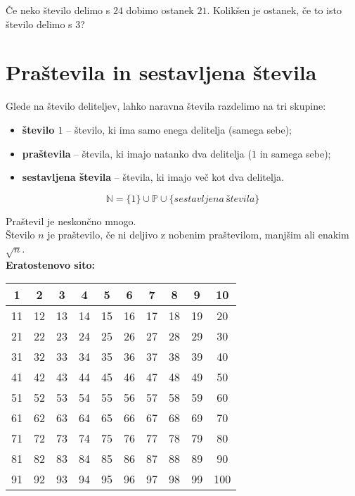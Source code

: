             \begin{naloga}
                Če neko število delimo s $24$ dobimo ostanek $21$. Kolikšen je ostanek, če to isto število delimo s $3$? 
            \end{naloga}



            \newpage
\section{Praštevila in sestavljena števila}
                
            Glede na število deliteljev, lahko naravna števila razdelimo na tri skupine:
            \begin{itemize}
                \item \textbf{število $1$} -- število, ki ima samo enega delitelja (samega sebe);
                \item \textbf{praštevila} -- števila, ki imajo natanko dva delitelja ($1$ in samega sebe);
                \item \textbf{sestavljena števila} -- števila, ki imajo več kot dva delitelja.
            \end{itemize}
            
            $$ \mathbb{N}=\{1\}\cup \mathbb{P}\cup \{sestavljena~števila\} $$
        

            Praštevil je neskončno mnogo.
            \\

            Število $n$ je praštevilo, če ni deljivo z nobenim praštevilom, manjšim ali enakim $\sqrt{n}$.
            \\

    
        \textbf{Eratostenovo sito:}
            \begin{longtable}{|c|c|c|c|c|c|c|c|c|c|}
                \hline
                1 & 2 & 3 & 4 & 5 & 6 & 7 & 8 & 9 & 10 \\
                \hline
                11 & 12 & 13 & 14 & 15 & 16 & 17 & 18 & 19 & 20 \\
                \hline
                21 & 22 & 23 & 24 & 25 & 26 & 27 & 28 & 29 & 30 \\
                \hline
                31 & 32 & 33 & 34 & 35 & 36 & 37 & 38 & 39 & 40 \\
                \hline
                41 & 42 & 43 & 44 & 45 & 46 & 47 & 48 & 49 & 50 \\
                \hline
                51 & 52 & 53 & 54 & 55 & 56 & 57 & 58 & 59 & 60 \\
                \hline
                61 & 62 & 63 & 64 & 65 & 66 & 67 & 68 & 69 & 70 \\
                \hline
                71 & 72 & 73 & 74 & 75 & 76 & 77 & 78 & 79 & 80 \\
                \hline
                81 & 82 & 83 & 84 & 85 & 86 & 87 & 88 & 89 & 90 \\
                \hline
                91 & 92 & 93 & 94 & 95 & 96 & 97 & 98 & 99 & 100 \\
                \hline
                \end{longtable}
            
